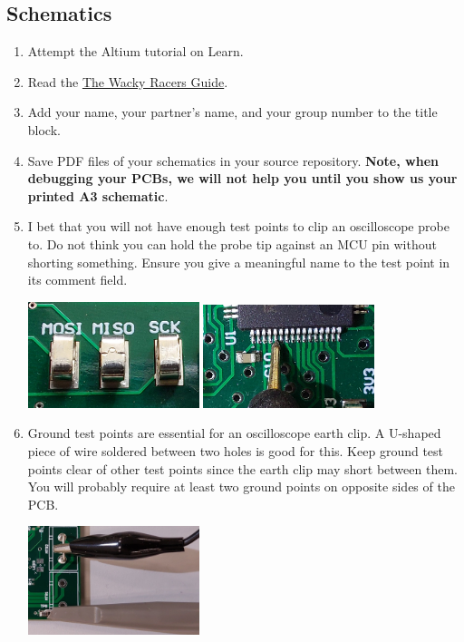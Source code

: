 \documentclass[11pt, a4paper]{article}
\newcommand{\theguide}{\href{https://eng-git.canterbury.ac.nz/wacky-racers/wacky-racers/-/blob/master/doc/guide/guide.pdf}{The Wacky Racers Guide}}
\begin{document}
\subsection{Schematics}

\begin{enumerate}
\item Attempt the Altium tutorial on Learn.

\item Read the \theguide.

\item Add your name, your partner's name, and your group number to the
  title block.

\item Save PDF files of your schematics in your source repository.
  \textbf{Note, when debugging your PCBs, we will not help you until
    you show us your printed A3 schematic}.

\item I bet that you will not have enough test points to clip an
  oscilloscope probe to.  Do not think you can hold the probe tip
  against an MCU pin without shorting something.  Ensure you give a
  meaningful name to the test point in its comment field.

  \includegraphics[width=5cm]{../guide/figs/testpoints.jpg}  \includegraphics[width=5cm]{../guide/figs/micro_probe_zoom.jpg}

\item Ground test points are essential for an oscilloscope earth clip.
  A U-shaped piece of wire soldered between two holes is good for this.
  Keep ground test points clear of other test points since the earth
  clip may short between them.  You will probably require at least two
  ground points on opposite sides of the PCB.

\includegraphics[width=5cm]{../guide/figs/scope_probe_testpoints.jpg}


\end{enumerate}
\end{document}
